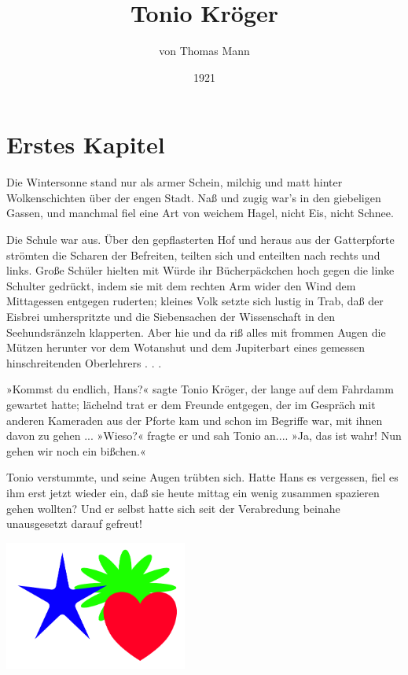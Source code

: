 \documentclass[a5paper,ngerman,11pt]{article}
\title{Tonio Kröger}
\author{von Thomas Mann}
\date{1921}
\begin{document}
\maketitle

\section{Erstes Kapitel}
Die Wintersonne stand nur als armer Schein, milchig und matt hinter
Wolkenschichten über der engen Stadt. Naß und zugig war's in den
giebeligen Gassen, und manchmal fiel eine Art von weichem Hagel, nicht
Eis, nicht Schnee.

Die Schule war aus. Über den gepflasterten Hof und heraus aus der
Gatterpforte strömten die Scharen der Befreiten, teilten sich und
enteilten nach rechts und links. Große Schüler hielten mit Würde ihr
Bücherpäckchen hoch gegen die linke Schulter gedrückt, indem sie mit dem
rechten Arm wider den Wind dem Mittagessen entgegen ruderten; kleines
Volk setzte sich lustig in Trab, daß der Eisbrei umherspritzte und die
Siebensachen der Wissenschaft in den Seehundsränzeln klapperten. Aber
hie und da riß alles mit frommen Augen die Mützen herunter vor dem
Wotanshut und dem Jupiterbart eines gemessen hinschreitenden
Oberlehrers . . .

»Kommst du endlich, Hans?« sagte Tonio Kröger, der lange auf dem
Fahrdamm gewartet hatte; lächelnd trat er dem Freunde entgegen, der im
Gespräch mit anderen Kameraden aus der Pforte kam und schon im Begriffe
war, mit ihnen davon zu gehen ... »Wieso?« fragte er und sah Tonio
an.... »Ja, das ist wahr! Nun gehen wir noch ein bißchen.«

Tonio verstummte, und seine Augen trübten sich. Hatte Hans es vergessen,
fiel es ihm erst jetzt wieder ein, daß sie heute mittag ein wenig
zusammen spazieren gehen wollten? Und er selbst hatte sich seit der
Verabredung beinahe unausgesetzt darauf gefreut!

\begin{center}
    \includegraphics[width=6cm]{HerzStern.pdf}    
\end{center}
\end{document}
